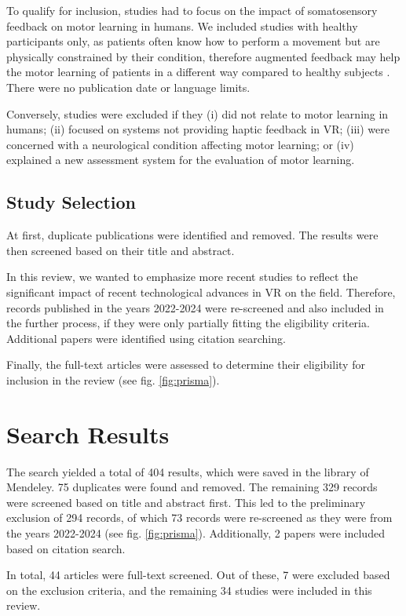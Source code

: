 To qualify for inclusion, studies had to focus on the impact of somatosensory feedback on motor learning in humans. We included studies with healthy participants only, as patients often know how to perform a movement but are physically constrained by their condition, therefore augmented feedback may help the motor learning of patients in a different way compared to healthy subjects \cite{Sigrist2013AugmentedReview}. There were no publication date or language limits.

Conversely, studies were excluded if they (i) did not relate to motor learning in humans; (ii) focused on systems not providing haptic feedback in VR; (iii) were concerned with a neurological condition affecting motor learning; or (iv) explained a new assessment system for the evaluation of motor learning.

\subsection{Study Selection}
At first, duplicate publications were identified and removed. The results were then screened based on their title and abstract. 

In this review, we wanted to emphasize more recent studies to reflect the significant impact of recent technological advances in VR on the field. Therefore, records published in the years 2022-2024 were re-screened and also included in the further process, if they were only partially fitting the eligibility criteria. Additional papers were identified using citation searching.

Finally, the full-text articles were assessed to determine their eligibility for inclusion in the review (see fig. \ref{fig:prisma}).


\section{Search Results}


The search yielded a total of 404 results, which were saved in the library of Mendeley. 75 duplicates were found and removed. The remaining 329 records were screened based on title and abstract first. This led to the preliminary exclusion of 294 records, of which 73 records were re-screened as they were from the years 2022-2024 (see fig. \ref{fig:prisma}). 
Additionally, 2 papers were included based on citation search. 

In total, 44 articles were full-text screened. Out of these, 7 were excluded based on the exclusion criteria, and the remaining 34 studies were included in this review.


